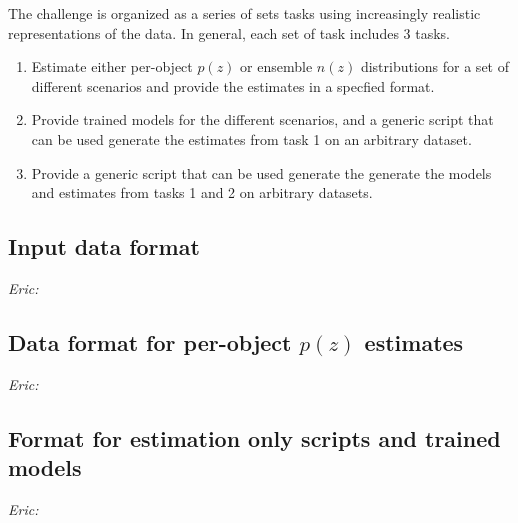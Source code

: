 \documentclass[modern]{desc-tex/styles/lsstdescnote}
\newcommand{\eac}[1]{{\em Eric:  }{\color{red}{#1}}}
\begin{document}
The challenge is organized as a series of sets tasks using
increasingly realistic representations of the data.   In general, each
set of task includes 3 tasks.

\begin{enumerate}
  \item{Estimate either per-object $p(z)$ or ensemble $n(z)$
      distributions for a set of different scenarios and provide the
      estimates in a specfied format.}
  \item{Provide trained models for the different scenarios, and a
      generic script that can be used generate the estimates from task
      1 on an arbitrary dataset.}    
  \item{Provide a generic script that can be used generate the
      generate the models and estimates from tasks 1 and 2 on
      arbitrary datasets.}
\end{enumerate}


\subsection{Input data format}

\eac{Details about data packaging}


\subsection{Data format for per-object $p(z)$ estimates}

\eac{Details about data packaging}








\subsection{Format for estimation only scripts and trained models}

\eac{Details about data packaging}
\end{document}
